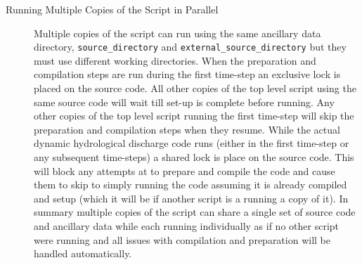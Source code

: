 \documentclass{article}
\begin{document}
\begin{description}
\item[Running Multiple Copies of the Script in Parallel] Multiple copies of the script can run using the same ancillary data directory, \lstinline[style=bash_input]{source_directory} and \lstinline[style=bash_input]{external_source_directory} but they must use different working directories. When the preparation and compilation steps are run during the first time-step an exclusive lock is placed on the source code. All other copies of the top level script using the same source code will wait till set-up is complete before running. Any other copies of the top level script running the first time-step will skip the preparation and compilation steps when they resume. While the actual dynamic hydrological discharge code runs (either in the first time-step or any subsequent time-steps) a shared lock is place on the source code. This will block any attempts at to prepare and compile the code and cause them to skip to simply running the code assuming it is already compiled and setup (which it will be if another script is a running a copy of it). In summary multiple copies of the script can share a single set of source code and ancillary data while each running individually as if no other script were running and all issues with compilation and preparation will be handled automatically.
\end{description}
\end{document}
